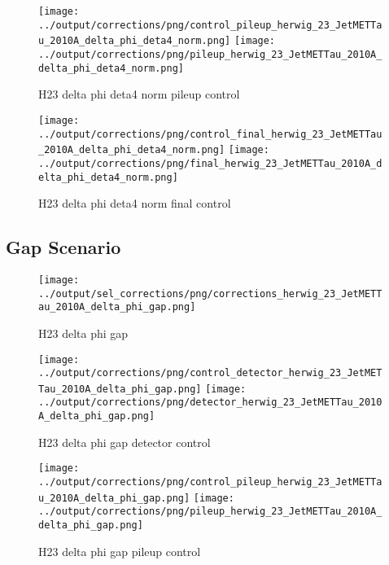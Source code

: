 \documentclass[11pt]{book}
\begin{document}
\begin{figure}[ht]
\centering
\texttt{[image: ../output/corrections/png/control\_pileup\_herwig\_23\_JetMETTau\_2010A\_delta\_phi\_deta4\_norm.png]}
\texttt{[image: ../output/corrections/png/pileup\_herwig\_23\_JetMETTau\_2010A\_delta\_phi\_deta4\_norm.png]}
\caption{H23 delta phi deta4 norm pileup control}
\label{fig:H23_JetMETTau_2010A_delta_phi_deta4_norm_pileup_control}
\end{figure}


\begin{figure}[ht]
\centering
\texttt{[image: ../output/corrections/png/control\_final\_herwig\_23\_JetMETTau\_2010A\_delta\_phi\_deta4\_norm.png]}
\texttt{[image: ../output/corrections/png/final\_herwig\_23\_JetMETTau\_2010A\_delta\_phi\_deta4\_norm.png]}
\caption{H23 delta phi deta4 norm final control}
\label{fig:H23_JetMETTau_2010A_delta_phi_deta4_norm_final_control}
\end{figure}

\clearpage
\subsection{Gap Scenario}

\begin{figure}[ht]
\centering
\texttt{[image: ../output/sel\_corrections/png/corrections\_herwig\_23\_JetMETTau\_2010A\_delta\_phi\_gap.png]}
\caption{H23 delta phi gap}
\label{fig:H23_JetMETTau_2010A_delta_phi_gap}
\end{figure}


\begin{figure}[ht]
\centering
\texttt{[image: ../output/corrections/png/control\_detector\_herwig\_23\_JetMETTau\_2010A\_delta\_phi\_gap.png]}
\texttt{[image: ../output/corrections/png/detector\_herwig\_23\_JetMETTau\_2010A\_delta\_phi\_gap.png]}
\caption{H23 delta phi gap detector control}
\label{fig:H23_JetMETTau_2010A_delta_phi_gap_detector_control}
\end{figure}

\begin{figure}[ht]
\centering
\texttt{[image: ../output/corrections/png/control\_pileup\_herwig\_23\_JetMETTau\_2010A\_delta\_phi\_gap.png]}
\texttt{[image: ../output/corrections/png/pileup\_herwig\_23\_JetMETTau\_2010A\_delta\_phi\_gap.png]}
\caption{H23 delta phi gap pileup control}
\label{fig:H23_JetMETTau_2010A_delta_phi_gap_pileup_control}
\end{figure}
\end{document}
